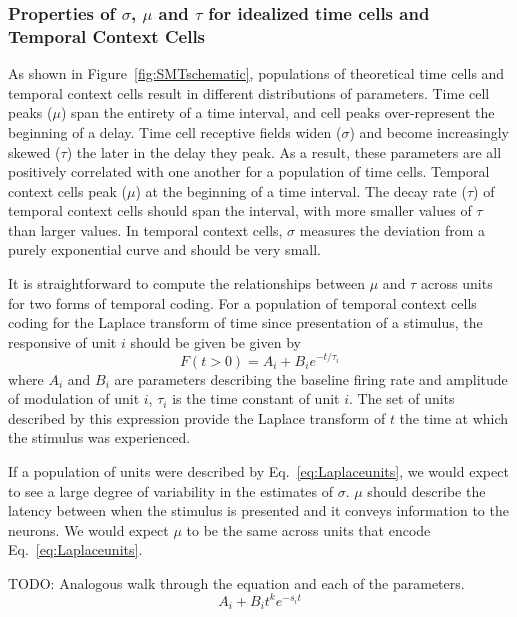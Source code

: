 \documentclass{apa}
\begin{document}
\subsubsection{Properties of $\sigma$, $\mu$ and $\tau$ for idealized time cells
and Temporal Context Cells}

As shown in Figure~\ref{fig:SMTschematic}, populations of theoretical time cells
and temporal context cells result in different distributions of parameters. Time
cell peaks ($\mu$) span the entirety of a time interval, and cell peaks over-represent
the beginning of a delay. Time cell receptive fields widen 
($\sigma$) and become increasingly skewed ($\tau$) the later in the delay they
peak. As a result, these parameters are all positively correlated with one another
for a population of time cells. Temporal context cells peak ($\mu$) at the
beginning of a time interval. The decay rate ($\tau$) of temporal
context cells should span the interval, with more smaller values of
$\tau$ than larger values. In temporal context cells, $\sigma$ measures
the deviation from a purely exponential curve and should be very small.  

It is straightforward to compute the relationships between $\mu$ and $\tau$
across units for two forms of temporal coding.  For a population of temporal
context cells coding for the Laplace transform of time since presentation of a
stimulus, the responsive of unit $i$ should be given be given by 
\begin{equation}
		F(t > 0) = A_i + B_i e^{- t/\tau_i}
		\label{eq:Laplaceunits}
\end{equation}
where $A_i$ and $B_i$ are parameters describing the baseline firing rate and
amplitude of modulation of unit $i$, $\tau_i$ is the time constant of unit
$i$.
The set of units described by this expression provide the Laplace transform of
$t$ the time at which the stimulus was experienced.

If a population of units were described by Eq.~\ref{eq:Laplaceunits}, we would
expect to see a large degree of variability in the estimates of $\sigma$.  
$\mu$ should describe the latency between when the stimulus is presented and
it conveys information to the neurons.  We would expect $\mu$ to be the same
across units that encode Eq.~\ref{eq:Laplaceunits}.

TODO: Analogous walk through the equation and each of the parameters.
\begin{equation}
		A_i + B_i  t^k e^{ -s_i t}
\end{equation}
\end{document}

